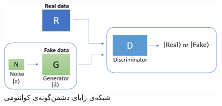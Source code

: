 \begin{figure}
	\centering
	\includegraphics[scale=0.4]{figures/qugan.png}
	\caption{شبکه‌ی زایای دشمن‌گونه‌ی کوانتومی}
	\label{fig:qugan}
\end{figure}



